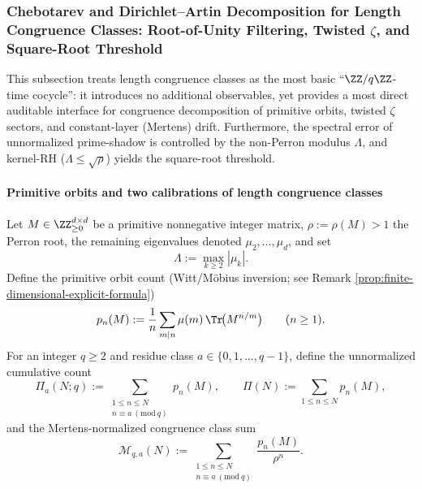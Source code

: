 
\subsubsection{Chebotarev and Dirichlet--Artin Decomposition for Length Congruence Classes: Root-of-Unity Filtering, Twisted \texorpdfstring{$\zeta$}{zeta}, and Square-Root Threshold}\label{subsubsec:zeta-online-kernel-length-modq-chebotarev}
This subsection treats length congruence classes as the most basic ``\(\ZZ/q\ZZ\)-time cocycle'': it introduces no additional observables, yet provides a most direct auditable interface for congruence decomposition of primitive orbits, twisted \(\zeta\) sectors, and constant-layer (Mertens) drift.
Furthermore, the spectral error of unnormalized prime-shadow is controlled by the non-Perron modulus \(\Lambda\), and kernel-RH (\(\Lambda\le\sqrt{\rho}\)) yields the square-root threshold.

\paragraph{Primitive orbits and two calibrations of length congruence classes}
Let \(M\in\ZZ_{\ge0}^{d\times d}\) be a primitive nonnegative integer matrix, \(\rho:=\rho(M)>1\) the Perron root, the remaining eigenvalues denoted \(\mu_2,\dots,\mu_d\), and set
\[
\Lambda:=\max_{k\ge2}|\mu_k|.
\]
Define the primitive orbit count (Witt/Möbius inversion; see Remark \ref{prop:finite-dimensional-explicit-formula})
\[
p_n(M):=\frac{1}{n}\sum_{m\mid n}\mu(m)\,\Tr\!\bigl(M^{n/m}\bigr)\qquad(n\ge1).
\]
For an integer \(q\ge2\) and residue class \(a\in\{0,1,\dots,q-1\}\), define the unnormalized cumulative count
\[
\Pi_a(N;q):=\sum_{\substack{1\le n\le N\\ n\equiv a\ (\mathrm{mod}\ q)}} p_n(M),
\qquad
\Pi(N):=\sum_{1\le n\le N}p_n(M),
\]
and the Mertens-normalized congruence class sum
\[
\mathcal{M}_{q,a}(N):=\sum_{\substack{1\le n\le N\\ n\equiv a\ (\mathrm{mod}\ q)}}\frac{p_n(M)}{\rho^{n}}.
\]

